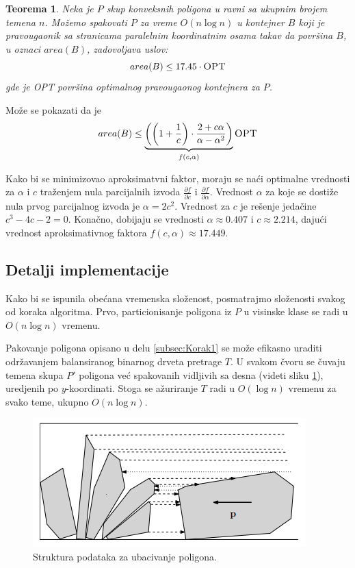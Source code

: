 \documentclass[a4paper]{article}
\theoremstyle{plain}
\newtheorem{thm}{Teorema}[section] %
\theoremstyle{definition}
\begin{document}
\begin{thm}
    Neka je $P$ skup konveksnih poligona u ravni sa ukupnim brojem temena $n$. Mo\v{z}emo spakovati $P$ za vreme $O(n\log{}n)$ u kontejner $B$ koji je pravougaonik sa stranicama paralelnim koordinatnim osama takav da povr\v{s}ina $B$, u oznaci $area(B)$, zadovoljava uslov: $$area(B) \leq 17.45 \cdot \textsc{OPT}$$ gde je \textsc{OPT} povr\v{s}ina optimalnog pravougaonog kontejnera za $P$. 
\end{thm}

Mo\v{z}e se pokazati da je $$area(B) \leq \underbrace{\left(\left(1+\frac{1}{c}\right) \cdot \frac{2 + c\alpha}{\alpha - \alpha^{2}}\right)}_{f(c,\alpha)} \textsc{OPT}$$ 

Kako bi se minimizovao aproksimatvni faktor, moraju se na\'c{}i optimalne vrednosti za $\alpha$ i $c$ tra\v{z}enjem nula parcijalnih izvoda $\frac{\partial f}{\partial c}$ i $\frac{\partial f}{\partial \alpha}$. Vrednost $\alpha$ za koje se dosti\v{z}e nula prvog parcijalnog izvoda je $\alpha = 2c^{2}$. Vrednost za $c$ je re\v{s}enje jeda\v{c}ine $c^{3} - 4c - 2 = 0$. Kona\v{c}no, dobijaju se vrednosti $\alpha \approx 0.407$ i $c \approx 2.214$, daju\'c{}i vrednost aproksimativnog faktora $f(c, \alpha) \approx 17.449$.


\subsection{Detalji implementacije}
\label{subsec:Implementacija}

Kako bi se ispunila obe\'c{}ana vremenska slo\v{z}enost, posmatrajmo slo\v{z}enosti svakog od koraka algoritma. Prvo, particionisanje poligona iz $P$ u visinske klase se radi u $O(n\log{}n)$ vremenu.

Pakovanje poligona opisano u delu \ref{subsec:Korak1} se mo\v{z}e efikasno uraditi odr\v{z}avanjem balansiranog binarnog drveta pretrage $T$. U svakom \v{c}voru se \v{c}uvaju temena skupa $P'$ poligona ve\'c{} spakovanih vidljivih sa desna (videti sliku \ref{fig2}), uredjenih po $y$-koordinati. Stoga se a\v{z}uriranje $T$ radi u $O(\log{}n)$ vremenu za svako teme, ukupno $O(n\log{}n)$. 

\begin{figure}[H]
    \centering
    \includegraphics[scale=0.7]{resources/fig2.PNG}
    \caption{Struktura podataka za ubacivanje poligona.}
    \label{fig2}
\end{figure}
\end{document}
